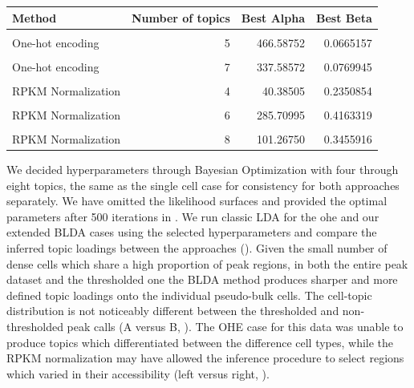 \begin{table}
  \centering
  \begin{tabular}[t]{lrrr}
  \toprule
  Method & Number of topics & Best Alpha & Best Beta\\
  \midrule
  \cellcolor{gray!6}{One-hot encoding} & \cellcolor{gray!6}{4} & \cellcolor{gray!6}{123.68822} & \cellcolor{gray!6}{0.0382351}\\
  One-hot encoding & 5 & 466.58752 & 0.0665157\\
  \cellcolor{gray!6}{One-hot encoding} & \cellcolor{gray!6}{6} & \cellcolor{gray!6}{450.96735} & \cellcolor{gray!6}{0.0756824}\\
  One-hot encoding & 7 & 337.58572 & 0.0769945\\
  \cellcolor{gray!6}{One-hot encoding} & \cellcolor{gray!6}{8} & \cellcolor{gray!6}{100.35205} & \cellcolor{gray!6}{0.0872716}\\
  \addlinespace
  RPKM Normalization & 4 & 40.38505 & 0.2350854\\
  \cellcolor{gray!6}{RPKM Normalization} & \cellcolor{gray!6}{5} & \cellcolor{gray!6}{285.51986} & \cellcolor{gray!6}{0.3011584}\\
  RPKM Normalization & 6 & 285.70995 & 0.4163319\\
  \cellcolor{gray!6}{RPKM Normalization} & \cellcolor{gray!6}{7} & \cellcolor{gray!6}{366.02309} & \cellcolor{gray!6}{0.3825605}\\
  RPKM Normalization & 8 & 101.26750 & 0.3455916\\
  \bottomrule
  \end{tabular}
  \label{table:pb_opt_params}
\end{table}

We decided hyperparameters through Bayesian Optimization with four through eight topics, the same as the single cell case for consistency for both approaches separately. We have omitted the likelihood surfaces and provided the optimal parameters after 500 iterations in . We run classic LDA for the \gls{ohe} and our extended BLDA cases using the selected hyperparameters and compare the inferred topic loadings between the approaches (). Given the small number of dense cells which share a high proportion of peak regions, in both the entire peak dataset and the thresholded one the BLDA method produces sharper and more defined topic loadings onto the individual pseudo-bulk cells. The cell-topic distribution is not noticeably different between the thresholded and non-thresholded peak calls (A versus B, ).
The OHE case for this data was unable to produce topics which differentiated between the difference cell types, while the RPKM normalization may have allowed the inference procedure to select regions which varied in their accessibility (left versus right, ). 

